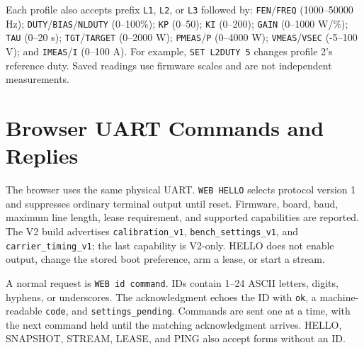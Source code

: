 Each profile also accepts prefix \texttt{L1}, \texttt{L2}, or \texttt{L3} followed by: \texttt{FEN}/\texttt{FREQ} (1000--50000 Hz); \texttt{DUTY}/\texttt{BIAS}/\texttt{NLDUTY} (0--100\%); \texttt{KP} (0--50); \texttt{KI} (0--200); \texttt{GAIN} (0--1000 W/\%); \texttt{TAU} (0--20 s); \texttt{TGT}/\texttt{TARGET} (0--2000 W); \texttt{PMEAS}/\texttt{P} (0--4000 W); \texttt{VMEAS}/\texttt{VSEC} (-5--100 V); and \texttt{IMEAS}/\texttt{I} (0--100 A). For example, \texttt{SET L2DUTY 5} changes profile 2's reference duty. Saved readings use firmware scales and are not independent measurements.

\section{Browser UART Commands and Replies}
\label{sec:app-fw-web}

The browser uses the same physical UART. \texttt{WEB HELLO} selects protocol version 1 and suppresses ordinary terminal output until reset. Firmware, board, baud, maximum line length, lease requirement, and supported capabilities are reported. The V2 build advertises \texttt{calibration\_v1}, \texttt{bench\_settings\_v1}, and \texttt{carrier\_timing\_v1}; the last capability is V2-only. HELLO does not enable output, change the stored boot preference, arm a lease, or start a stream.

A normal request is \texttt{WEB id command}. IDs contain 1--24 ASCII letters, digits, hyphens, or underscores. The acknowledgment echoes the ID with \texttt{ok}, a machine-readable \texttt{code}, and \texttt{settings\_pending}. Commands are sent one at a time, with the next command held until the matching acknowledgment arrives. HELLO, SNAPSHOT, STREAM, LEASE, and PING also accept forms without an ID.

